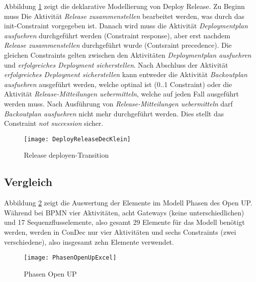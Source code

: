 Abbildung \ref{fig:DeployReleaseDecKlein} zeigt die deklarative Modellierung von Deploy Release.\newline
Zu Beginn muss Die Aktivität \textit{Release zusammenstellen} bearbeitet werden, was durch das init-Constraint vorgegeben ist. Danach wird muss die Aktivität \textit{Deploymentplan ausfuehren} durchgeführt werden (Constraint response), aber erst nachdem \textit{Release zusammenstellen} durchgeführt wurde (Contsraint precedence).\newline
Die gleichen Constraints gelten zwischen den Aktivitäten \textit{Deploymentplan ausfuehren} und \textit{erfolgreiches Deployment sicherstellen}.\newline
Nach Abschluss der Aktivität \textit{erfolgreiches Deployment sicherstellen} kann entweder die Aktivität \textit{Backoutplan ausfuehren} ausgeführt werden, welche optinal ist (0..1 Constraint) oder die Aktivität \textit{Release-Mitteilungen uebermitteln}, welche auf jeden Fall ausgeführt werden muss.\newline 
Nach Ausführung von \textit{Release-Mitteilungen uebermitteln} darf \textit{Backoutplan ausfuehren} nicht mehr durchgeführt werden. Dies stellt das Constraint \textit{not succession} sicher.
\begin{figure}[htp]
\begin{center}
  \texttt{[image: DeployReleaseDecKlein]} %
  \caption{Release deployen-Transition}
  \label{fig:DeployReleaseDecKlein}
\end{center}
\end{figure}


\subsection{Vergleich}

Abbildung \ref{fig:PhasenOpenUpExcel} zeigt die Auswertung der Elemente im Modell Phasen des Open UP. Während bei BPMN vier Aktivitäten, acht Gateways (keine unterschiedlichen) und 17 Sequenzflusselemente, also gesamt 29 Elemente für das Modell benötigt werden, werden in ConDec nur vier Aktivitäten und sechs Constraints (zwei verschiedene), also insgesamt zehn Elemente verwendet.

\begin{figure}[htp]
\begin{center}
  \texttt{[image: PhasenOpenUpExcel]} %
  \caption{Phasen Open UP}
  \label{fig:PhasenOpenUpExcel}
\end{center}
\end{figure}


